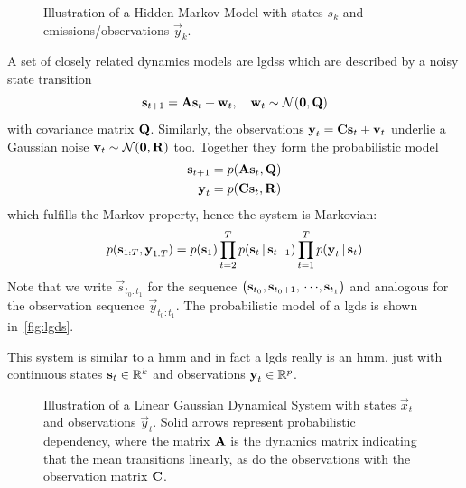 	\begin{figure}
		\centering
		\tikzHiddenMarkovModel
		\caption[Illustration of a hidden Markov model]{Illustration of a Hidden Markov Model with states \(s_k\) and emis\-sions/observations \(\vec{y}_k\).}
		\label{fig:hiddenMarkovModel}
	\end{figure}

	A set of closely related dynamics models are \acp{lgds} which are described by a noisy state transition
	\begin{equation*}
		\boldsymbol{\mathrm{s}}_{t + 1} = \boldsymbol{\mathrm{A}} \boldsymbol{\mathrm{s}}_t + \boldsymbol{\mathrm{w}}_t,\quad \boldsymbol{\mathrm{w}}_t \sim \mathcal{N}(\boldsymbol{\mathrm{0}}, \boldsymbol{\mathrm{Q}})
	\end{equation*}
	with covariance matrix \(\boldsymbol{\mathrm{Q}}\). Similarly, the observations \( \boldsymbol{\mathrm{y}}_t = \boldsymbol{\mathrm{C}} \boldsymbol{\mathrm{s}}_t + \boldsymbol{\mathrm{v}}_t \) underlie a Gaussian noise \( \boldsymbol{\mathrm{v}}_t \sim \mathcal{N}(\boldsymbol{\mathrm{0}}, \boldsymbol{\mathrm{R}}) \) too. Together they form the probabilistic model
	\begin{align*}
		\boldsymbol{\mathrm{s}}_{t + 1} &= p(\boldsymbol{\mathrm{A}} \boldsymbol{\mathrm{s}}_t, \boldsymbol{\mathrm{Q}}) \\
		\boldsymbol{\mathrm{y}}_t &= p(\boldsymbol{\mathrm{C}} \boldsymbol{\mathrm{s}}_t, \boldsymbol{\mathrm{R}})
	\end{align*}
	which fulfills the Markov property, hence the system is Markovian:
	\begin{equation*}
		p(\boldsymbol{\mathrm{s}}_{1:T}, \boldsymbol{\mathrm{y}}_{1:T}) = p(\boldsymbol{\mathrm{s}}_1) \prod_{t = 2}^{T} p(\boldsymbol{\mathrm{s}}_t \,\vert\, \boldsymbol{\mathrm{s}}_{t - 1}) \prod_{t = 1}^{T} p(\boldsymbol{\mathrm{y}}_t \,\vert\, \boldsymbol{\mathrm{s}}_t)
	\end{equation*}
	Note that we write \( \vec{s}_{t_0:t_1} \) for the sequence \( \big( \boldsymbol{\mathrm{s}}_{t_0}, \boldsymbol{\mathrm{s}}_{t_0 + 1}, \,\cdots\!, \boldsymbol{\mathrm{s}}_{t_1} \big) \) and analogous for the observation sequence \( \vec{y}_{t_0:t_1} \). The probabilistic model of a \ac{lgds} is shown in~\autoref{fig:lgds}.

	This system is similar to a \ac{hmm} and in fact a \ac{lgds} really is an \ac{hmm}, just with continuous states \( \boldsymbol{\mathrm{s}}_t \in \mathbb{R}^k \) and observations \( \boldsymbol{\mathrm{y}}_t \in \mathbb{R}^p \).

	\begin{figure}
		\centering
		\tikzLinearGaussianDynamicalSystem
		\caption[Illustration of a LGDS]{Illustration of a Linear Gaussian Dynamical System with states \(\vec{x}_t\) and observations \(\vec{y}_t\). Solid arrows represent probabilistic dependency, where the matrix \(\boldsymbol{\mathrm{A}}\) is the dynamics matrix indicating that the mean transitions linearly, as do the observations with the observation matrix \(\boldsymbol{\mathrm{C}}\).}
		\label{fig:lgds}
	\end{figure}

